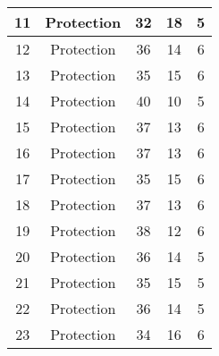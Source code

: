 \documentclass[results.tex]{subfiles}
\begin{document}
\begin{center}
\begin{tabular}{| c || c | c | c | c |}
            \hline
            11                      & Protection                   & 32                     & 18                      & 5                    \\
            \hline
            12                      & Protection                   & 36                     & 14                      & 6                    \\
            \hline
            13                      & Protection                   & 35                     & 15                      & 6                    \\
            \hline
            14                      & Protection                   & 40                     & 10                      & 5                    \\
            \hline
            15                      & Protection                   & 37                     & 13                      & 6                    \\
            \hline
            16                      & Protection                   & 37                     & 13                      & 6                    \\
            \hline
            17                      & Protection                   & 35                     & 15                      & 6                    \\
            \hline
            18                      & Protection                   & 37                     & 13                      & 6                    \\
            \hline
            19                      & Protection                   & 38                     & 12                      & 6                    \\
            \hline
            20                      & Protection                   & 36                     & 14                      & 5                    \\
            \hline
            21                      & Protection                   & 35                     & 15                      & 5                    \\
            \hline
            22                      & Protection                   & 36                     & 14                      & 5                    \\
            \hline
            23                      & Protection                   & 34                     & 16                      & 6                    \\

\end{tabular}
\end{center}
\end{document}
